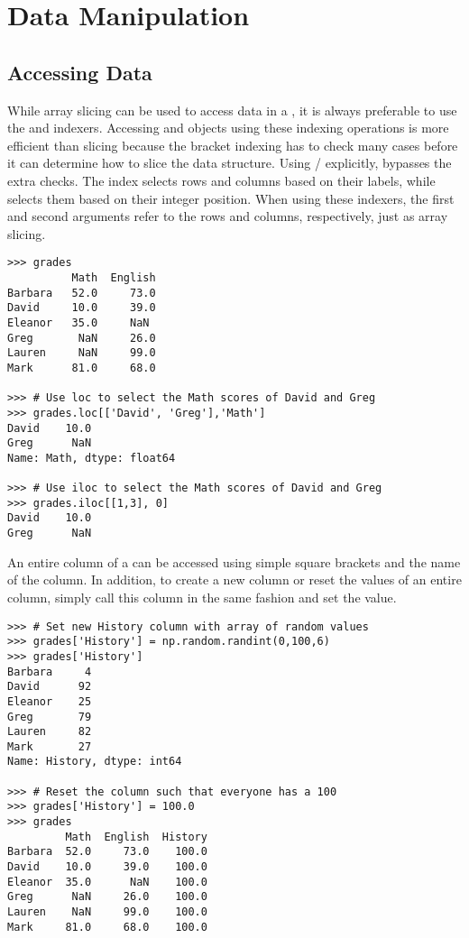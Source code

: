\section*{Data Manipulation}

\subsection*{Accessing Data}

While array slicing can be used to access data in a , it is always preferable to use the  and  indexers.
Accessing  and  objects
using these indexing operations is more efficient than slicing because the bracket indexing has to check many cases before it can determine how to slice the data structure.
Using / explicitly, bypasses the extra checks.
The  index selects rows and columns based on
their labels, while  selects them based on their
integer position.
When using these indexers, the first and second arguments refer to the rows and columns, respectively, just as array slicing.

\begin{lstlisting}
>>> grades
	      Math  English
Barbara   52.0     73.0
David     10.0     39.0
Eleanor   35.0     NaN
Greg       NaN     26.0
Lauren     NaN     99.0
Mark      81.0     68.0

>>> # Use loc to select the Math scores of David and Greg
>>> grades.loc[['David', 'Greg'],'Math']
David    10.0
Greg      NaN
Name: Math, dtype: float64

>>> # Use iloc to select the Math scores of David and Greg
>>> grades.iloc[[1,3], 0]
David    10.0
Greg      NaN
\end{lstlisting}

An entire column of a  can be accessed using simple square
brackets and the name of the column.
In addition, to create a new column or reset the values of an entire column, simply call this column in the same fashion and set the value.

\begin{lstlisting}
>>> # Set new History column with array of random values
>>> grades['History'] = np.random.randint(0,100,6)
>>> grades['History']
Barbara     4
David      92
Eleanor    25
Greg       79
Lauren     82
Mark       27
Name: History, dtype: int64

>>> # Reset the column such that everyone has a 100
>>> grades['History'] = 100.0
>>> grades
         Math  English  History
Barbara  52.0     73.0    100.0
David    10.0     39.0    100.0
Eleanor  35.0      NaN    100.0
Greg      NaN     26.0    100.0
Lauren    NaN     99.0    100.0
Mark     81.0     68.0    100.0
\end{lstlisting}



